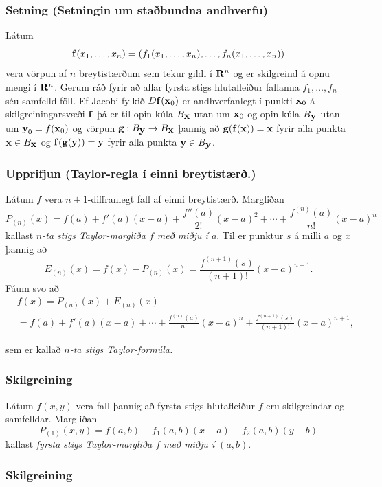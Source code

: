 \subsubsection{Setning  (Setningin um staðbundna andhverfu)}
Látum $$\mbox{${\bf f}$}(x_1,\ldots,
x_n)=(f_1(x_1,\ldots,x_n),\ldots,f_n(x_1,\ldots,x_n))$$ vera vörpun af
$n$ breytistærðum sem tekur gildi í $\mbox{${\bf R}^n$}$ og er skilgreind á opnu
mengi í $\mbox{${\bf R}^n$}$.   Gerum ráð fyrir að allar
fyrsta stigs hlutafleiður fallanna $f_1, \ldots, f_n$ séu samfelld
föll.  Ef Jacobi-fylkið $D\mbox{${\bf f}$}(\mbox{${\bf x}$}_0)$ er andhverfanlegt í punkti
$\mbox{${\bf x}$}_0$ á skilgreiningarsvæði $\mbox{${\bf f}$}$ þá er til opin kúla $B_{\mbox{${\bf x}$}}$ utan
um $\mbox{${\bf x}$}_0$ og opin kúla $B_{\mbox{${\bf y}$}}$ utan um $\mbox{${\bf y}$}_0=f(\mbox{${\bf x}$}_0)$ og vörpun
$\mbox{${\bf g}$}:B_{\mbox{${\bf y}$}}\rightarrow B_{\mbox{${\bf x}$}}$ þannig að 
$\mbox{${\bf g}$}(\mbox{${\bf f}$}(\mbox{${\bf x}$}))=\mbox{${\bf x}$}$ fyrir alla punkta $\mbox{${\bf x}$}\in B_{\mbox{${\bf x}$}}$ og 
$\mbox{${\bf f}$}(\mbox{${\bf g}$}(\mbox{${\bf y}$}))=\mbox{${\bf y}$}$ fyrir alla punkta $\mbox{${\bf y}$}\in B_{\mbox{${\bf y}$}}$.




\subsubsection{Upprifjun  (Taylor-regla í einni breytistærð.)}
  Látum 
$f$ vera $n+1$-diffranlegt fall af einni breytistærð.  Margliðan 
$$P_{(n)}(x)=f(a)+f'(a)(x-a)+\frac{f''(a)}{2!}(x-a)^2
+\cdots+\frac{f^{(n)}(a)}{n!}(x-a)^n$$
kallast {\em $n$-ta stigs Taylor-margliða $f$ með miðju í $a$}.
Til er punktur $s$ á milli $a$ og $x$ þannig að 
$$E_{(n)}(x)=f(x)-P_{(n)}(x)=\frac{f^{(n+1)}(s)}{(n+1)!}(x-a)^{n+1}.$$
Fáum svo að 
\begin {align*}
&f(x)=P_{(n)}(x)+E_{(n)}(x) \\
&=f(a)+f'(a)(x-a)+\cdots+\frac{f^{(n)}(a)}{n!}(x-a)^n
+\frac{f^{(n+1)}(s)}{(n+1)!}(x-a)^{n+1}, 
\end {align*}

 
sem er kallað {\em $n$-ta stigs Taylor-formúla.}



 

\subsubsection{Skilgreining }
 Látum $f(x,y)$ vera fall þannig að fyrsta stigs hlutafleiður $f$ eru skilgreindar og samfelldar.  Margliðan
$$P_{(1)}(x,y)=f(a,b)+f_1(a,b)(x-a)+f_2(a,b)(y-b)$$
kallast {\em fyrsta stigs Taylor-margliða $f$ með miðju í $(a,b)$}. 



\subsubsection{Skilgreining }

